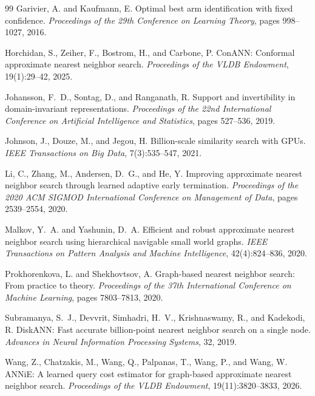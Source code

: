 \documentclass{article}
\begin{document}
\begin{thebibliography}{99}
Garivier, A. and Kaufmann, E.
Optimal best arm identification with fixed confidence.
\emph{Proceedings of the 29th Conference on Learning Theory}, pages 998--1027, 2016.

Horchidan, S., Zeiher, F., Bostrom, H., and Carbone, P.
ConANN: Conformal approximate nearest neighbor search.
\emph{Proceedings of the VLDB Endowment}, 19(1):29--42, 2025.

Johansson, F.~D., Sontag, D., and Ranganath, R.
Support and invertibility in domain-invariant representations.
\emph{Proceedings of the 22nd International Conference on Artificial Intelligence and Statistics}, pages
527--536, 2019.

Johnson, J., Douze, M., and Jegou, H.
Billion-scale similarity search with GPUs.
\emph{IEEE Transactions on Big Data}, 7(3):535--547, 2021.

Li, C., Zhang, M., Andersen, D.~G., and He, Y.
Improving approximate nearest neighbor search through learned adaptive early termination.
\emph{Proceedings of the 2020 ACM SIGMOD International Conference on Management of Data}, pages
2539--2554, 2020.

Malkov, Y.~A. and Yashunin, D.~A.
Efficient and robust approximate nearest neighbor search using hierarchical navigable small world graphs.
\emph{IEEE Transactions on Pattern Analysis and Machine Intelligence}, 42(4):824--836, 2020.

Prokhorenkova, L. and Shekhovtsov, A.
Graph-based nearest neighbor search: From practice to theory.
\emph{Proceedings of the 37th International Conference on Machine Learning}, pages 7803--7813, 2020.

Subramanya, S.~J., Devvrit, Simhadri, H.~V., Krishnaswamy, R., and Kadekodi, R.
DiskANN: Fast accurate billion-point nearest neighbor search on a single node.
\emph{Advances in Neural Information Processing Systems}, 32, 2019.

Wang, Z., Chatzakis, M., Wang, Q., Palpanas, T., Wang, P., and Wang, W.
ANNiE: A learned query cost estimator for graph-based approximate nearest neighbor search.
\emph{Proceedings of the VLDB Endowment}, 19(11):3820--3833, 2026.


\end{thebibliography}
\end{document}
